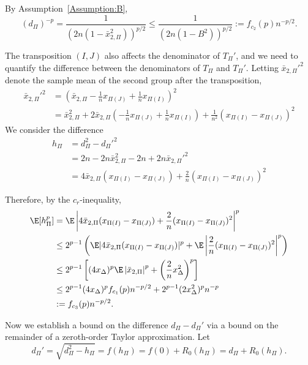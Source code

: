 By Assumption~\eqref{Assumption:B},
\begin{equation}
\label{def:dp}
  (d_{\Pi})^{-p} = \frac{1}{(2n(1-\bar{x}_{2,\Pi}^2))^{p/2}} \leq \frac{1}{(2n(1-B^2))^{p/2}} :=
  f_{c_2}(p) n^{-p/2}.
\end{equation}

The transposition $(I, J)$ also affects the denominator of $T_{\Pi}'$, and we need to quantify the
difference between the denominators of $T_{\Pi}$ and $T_{\Pi}'$.  Letting $\bar{x}_{2,\Pi}'^2$
denote the sample mean of the second group after the transposition,
\begin{align*}
  \bar{x}_{2,\Pi}'^2 &= \left ( \bar{x}_{2,\Pi}-\frac{1}{n}x_{\Pi(J)}+\frac{1}{n}x_{\Pi(I)} \right )^2 \\
  &= \bar{x}_{2,\Pi}^2 + 2 \bar{x}_{2,\Pi} \left ( -\frac{1}{n}x_{\Pi(J)} +
      \frac{1}{n}x_{\Pi(I)} \right ) + \frac{1}{n^2}(x_{\Pi(I)} - x_{\Pi(J)})^2
\end{align*}
We consider the difference
\begin{align*}
  h_{\Pi} &= d_{\Pi}^2 - d_{\Pi}'^2 \\
  &= 2n - 2n \bar{x}_{2,\Pi}^2 - 2n + 2n\bar{x}_{2,\Pi}'^2 \\
  &= 4\bar{x}_{2,\Pi}(x_{\Pi(I)} - x_{\Pi(J)}) + \frac{2}{n}(x_{\Pi(I)} - x_{\Pi(J)})^2
\end{align*}

Therefore, by the $c_r$-inequality,
\begin{align}
  \E[h_{\Pi}^p] &= \E \left | 4\bar{x}_{2,\Pi}(x_{\Pi(I)}-x_{\Pi(J)}) +
      \frac{2}{n}(x_{\Pi(I)}-x_{\Pi(J)})^2 \right |^p \nonumber \\
  &\leq 2^{p-1} \left ( \E |4\bar{x}_{2,\Pi}(x_{\Pi(I)}-x_{\Pi(J)})|^p
    + \E \left |\frac{2}{n}(x_{\Pi(I)}-x_{\Pi(J)})^2 \right |^p \right ) \nonumber \\
  &\leq 2^{p-1}\left [ (4x_{\Delta})^p \E \left | \bar{x}_{2,\Pi} \right |^p
    + \left ( \frac{2}{n}x_{\Delta}^2 \right )^p \right ] \nonumber \\
  &\leq 2^{p-1} (4x_{\Delta})^p f_{c_1}(p)n^{-p/2} +
  2^{p-1}(2x_{\Delta}^2)^pn^{-p} \nonumber \\
  &:= f_{c_3}(p)n^{-p/2} \label{def:hp}.
\end{align}

Now we establish a bound on the difference $d_{\Pi}-d_{\Pi}'$ via a
bound on the remainder of a zeroth-order Taylor approximation.  Let
\begin{equation*}
  d_{\Pi}' = \sqrt{d_{\Pi}^2-h_{\Pi}} = f(h_{\Pi}) = f(0) + R_0(h_{\Pi}) = d_{\Pi} + R_0(h_{\Pi}).
\end{equation*}

